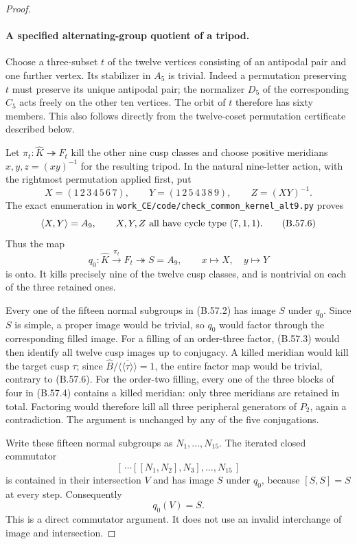 \begin{proof}
\paragraph{A specified alternating-group quotient of a tripod.}
Choose a three-subset $t$ of the twelve vertices consisting
of an antipodal pair and one further vertex. Its stabilizer
in $A_5$ is trivial. Indeed a permutation preserving $t$
must preserve its unique antipodal pair; the normalizer
$D_5$ of the corresponding $C_5$ acts freely on the other
ten vertices. The orbit of $t$ therefore has sixty members.
This also follows directly from the twelve-coset
permutation certificate described below.

Let $\pi_t:\widehat K\twoheadrightarrow F_t$ kill the
other nine cusp classes and choose positive meridians
$x,y,z=(xy)^{-1}$ for the resulting tripod. In the
natural nine-letter action, with the rightmost permutation
applied first, put
\[
 X=(1\,2\,3\,4\,5\,6\,7),\qquad
 Y=(1\,2\,5\,4\,3\,8\,9),\qquad Z=(XY)^{-1}.
                                                               \tag{B.57.5}
\]
The exact enumeration in
\texttt{work\_CE/code/check\_common\_kernel\_alt9.py}
proves
\[
 \langle X,Y\rangle=A_9,\qquad
        X,Y,Z\hbox{ all have cycle type }(7,1,1).           \tag{B.57.6}
\]
Thus the map
\[
       q_0:\widehat K\xrightarrow{\pi_t}F_t
                     \twoheadrightarrow S=A_9,
                  \qquad x\mapsto X,\quad y\mapsto Y      \tag{B.57.7}
\]
is onto. It kills precisely nine of the twelve cusp
classes, and is nontrivial on each of the three retained
ones.

Every one of the fifteen normal subgroups in (B.57.2)
has image $S$ under $q_0$. Since $S$ is simple, a proper
image would be trivial, so $q_0$ would factor through
the corresponding filled image. For a filling of an
order-three factor, (B.57.3) would then identify all
twelve cusp images up to conjugacy. A killed meridian
would kill the target cusp $\tau$; since
$\widehat B/\overline{\langle\!\langle\tau\rangle\!\rangle}=1$,
the entire factor map would be trivial, contrary to
(B.57.6). For the order-two filling, every one of the
three blocks of four in (B.57.4) contains a killed
meridian: only three meridians are retained in total.
Factoring would therefore kill all three peripheral
generators of $P_2$, again a contradiction.
The argument is unchanged by any of the five
conjugations.

Write these fifteen normal subgroups as $N_1,\ldots,N_{15}$.
The iterated closed commutator
\[
        [\,\cdots[[N_1,N_2],N_3],\ldots,N_{15}\,]
\]
is contained in their intersection $V$ and has image
$S$ under $q_0$, because $[S,S]=S$ at every step.
Consequently
\[
                              q_0(V)=S.                  \tag{B.57.8}
\]
This is a direct commutator argument. It does not use
an invalid interchange of image and intersection.


\end{proof}
